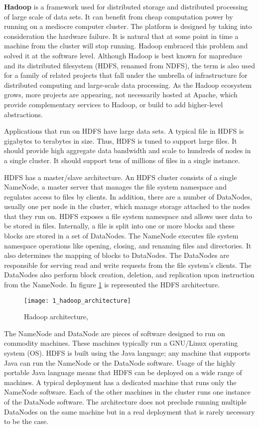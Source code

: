 \textbf{Hadoop} is a framework used for distributed storage and distributed processing of large scale of data sets. It can benefit from cheap computation power by running on a mediocre computer cluster. The platform is designed by taking into consideration the hardware failure. It is natural that at some point in time a machine from the cluster will stop running. Hadoop embraced this problem and solved it at the software level. Although Hadoop is best known for mapreduce and its distributed filesystem (HDFS, renamed from NDFS), the term is also used for a family of related projects that fall under the umbrella of infrastructure for distributed computing and large-scale data processing. As the Hadoop ecosystem grows, more projects are appearing, not necessarily hosted at Apache, which provide complementary services to Hadoop, or build to add higher-level abstractions.

Applications that run on HDFS have large data sets. A typical file in HDFS is gigabytes to terabytes in size. Thus, HDFS is tuned to support large files. It should provide high aggregate data bandwidth and scale to hundreds of nodes in a single cluster. It should support tens of millions of files in a single instance.

HDFS has a master/slave architecture. An HDFS cluster consists of a single NameNode, a master server that manages the file system namespace and regulates access to files by clients. In addition, there are a number of DataNodes, usually one per node in the cluster, which manage storage attached to the nodes that they run on. HDFS exposes a file system namespace and allows user data to be stored in files. Internally, a file is split into one or more blocks and these blocks are stored in a set of DataNodes. The NameNode executes file system namespace operations like opening, closing, and renaming files and directories. It also determines the mapping of blocks to DataNodes. The DataNodes are responsible for serving read and write requests from the file system’s clients. The DataNodes also perform block creation, deletion, and replication upon instruction from the NameNode. In figure \mbox{\ref{hadoop_architecture}} is represented the HDFS architecture.

\begin{figure}[!ht]
\centering
\texttt{[image: 1\_hadoop\_architecture]}
\caption{Hadoop architecture, \cite{data_mining_image}}\label{hadoop_architecture}
\end{figure}

The NameNode and DataNode are pieces of software designed to run on commodity machines. These machines typically run a GNU/Linux operating system (OS). HDFS is built using the Java language; any machine that supports Java can run the NameNode or the DataNode software. Usage of the highly portable Java language means that HDFS can be deployed on a wide range of machines. A typical deployment has a dedicated machine that runs only the NameNode software. Each of the other machines in the cluster runs one instance of the DataNode software. The architecture does not preclude running multiple DataNodes on the same machine but in a real deployment that is rarely necessary to be the case.

